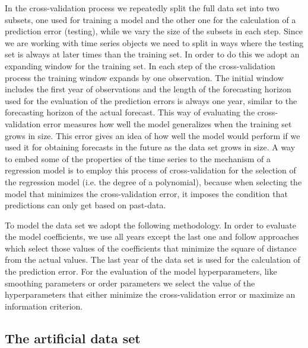 \documentclass[12pt, letterpaper]{article}\usepackage[]{graphicx}\usepackage[]{color}
\begin{document}
In the cross-validation process we repeatedly split the full data set into two subsets, one used for training a model and the other one for the calculation of a prediction error (testing), while we vary the size of the subsets in each step. Since we are working with time series objects we need to split in ways where the testing set is always at later times than the training set. In order to do this we adopt an expanding window for the training set. In each step of the cross-validation process the training window expands by one observation. The initial window includes the first year of observations and the length of the forecasting horizon used for the evaluation of the prediction errors is always one year, similar to the forecasting horizon of the actual forecast. This way of evaluating the cross-validation error measures how well the model generalizes when the training set grows in size. This error gives an idea of how well the model would perform if we used it for obtaining forecasts in the future as the data set grows in size. A way to embed some of the properties of the time series to the mechanism of a regression model is to employ this process of cross-validation for the selection of the regression model (i.e. the degree of a polynomial), because when selecting the model that minimizes the cross-validation error, it imposes the condition that predictions can only get based on past-data.

To model the data set we adopt the following methodology. In order to evaluate the model coefficients, we use all years except the last one and follow approaches which select those values of the coefficients that minimize the square of distance from the actual values. The last year of the data set is used for the calculation of the prediction error. For the evaluation of the model hyperparameters, like smoothing parameters or order parameters we select the value of the hyperparameters that either minimize the cross-validation error or maximize an information criterion. 

\subsection{The artificial data set}
\end{document}
